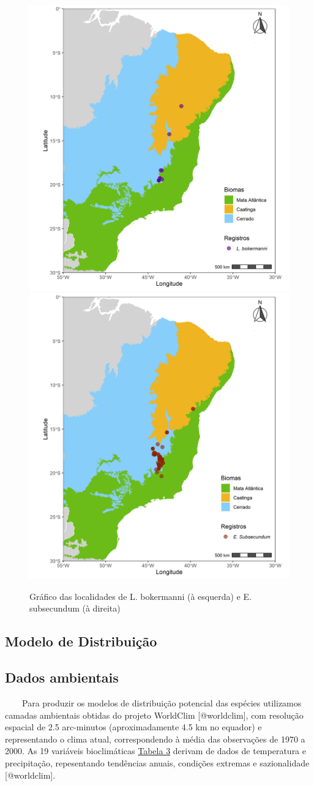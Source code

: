 \documentclass[
  11pt,
]{article}
\begin{document}
\begin{figure}

{\centering \includegraphics[width=0.49\linewidth]{../Graficos/Figure_1} \includegraphics[width=0.49\linewidth]{../Graficos/Figure_2} 

}

\caption{Gráfico das localidades de L. bokermanni (à esquerda) e E. subsecundum (à direita)}\label{fig:plot_bokermanni}
\end{figure}

\hypertarget{modelo-de-distribuiuxe7uxe3o}{%
\subsection{Modelo de Distribuição}\label{modelo-de-distribuiuxe7uxe3o}}

\hypertarget{dados-ambientais}{%
\subsection{Dados ambientais}\label{dados-ambientais}}

~~~~Para produzir os modelos de distribuição potencial das espécies
utilizamos camadas ambientais obtidas do projeto WorldClim
{[}@worldclim{]}, com resolução espacial de 2.5 arc-minutos
(aproximadamente 4.5 km no equador) e representando o clima atual,
correspondendo à média das observações de 1970 a 2000. As 19 variáveis
bioclimáticas \protect\hyperlink{apuxeandice}{Tabela 3} derivam de dados
de temperatura e precipitação, repesentando tendências anuais, condições
extremas e sazionalidade {[}@worldclim{]}.
\end{document}
